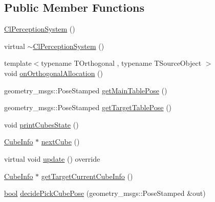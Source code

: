 \subsection*{Public Member Functions}
\begin{DoxyCompactItemize}
\item 
\hyperlink{classsm__moveit__screw__loop_1_1cl__perception__system_1_1ClPerceptionSystem_a5a52d556c4803761c7f33cd6f337861b}{Cl\+Perception\+System} ()
\item 
virtual \hyperlink{classsm__moveit__screw__loop_1_1cl__perception__system_1_1ClPerceptionSystem_a5f4c34645ff095773988180c861456d0}{$\sim$\+Cl\+Perception\+System} ()
\item 
{\footnotesize template$<$typename T\+Orthogonal , typename T\+Source\+Object $>$ }\\void \hyperlink{classsm__moveit__screw__loop_1_1cl__perception__system_1_1ClPerceptionSystem_aa8d51d8eb33bfb62e25e623bc7ee1ec0}{on\+Orthogonal\+Allocation} ()
\item 
geometry\+\_\+msgs\+::\+Pose\+Stamped \hyperlink{classsm__moveit__screw__loop_1_1cl__perception__system_1_1ClPerceptionSystem_a134e71d552de7d2a601927cdb2903d2b}{get\+Main\+Table\+Pose} ()
\item 
geometry\+\_\+msgs\+::\+Pose\+Stamped \hyperlink{classsm__moveit__screw__loop_1_1cl__perception__system_1_1ClPerceptionSystem_aaef94ec7b4e2e9249829d4b24ad2499e}{get\+Target\+Table\+Pose} ()
\item 
void \hyperlink{classsm__moveit__screw__loop_1_1cl__perception__system_1_1ClPerceptionSystem_ae6355186bed36a732791854be792e200}{print\+Cubes\+State} ()
\item 
\hyperlink{structsm__moveit__screw__loop_1_1cl__perception__system_1_1CubeInfo}{Cube\+Info} $\ast$ \hyperlink{classsm__moveit__screw__loop_1_1cl__perception__system_1_1ClPerceptionSystem_a9f58986a4ad466ba1e5b46e9d4d971ac}{next\+Cube} ()
\item 
virtual void \hyperlink{classsm__moveit__screw__loop_1_1cl__perception__system_1_1ClPerceptionSystem_a171e1bf0334b2eb957792ecb3ad11b7a}{update} () override
\item 
\hyperlink{structsm__moveit__screw__loop_1_1cl__perception__system_1_1CubeInfo}{Cube\+Info} $\ast$ \hyperlink{classsm__moveit__screw__loop_1_1cl__perception__system_1_1ClPerceptionSystem_ad9231b87b9592cc5c847ce1b92a75446}{get\+Target\+Current\+Cube\+Info} ()
\item 
\hyperlink{classbool}{bool} \hyperlink{classsm__moveit__screw__loop_1_1cl__perception__system_1_1ClPerceptionSystem_ad56389a13e7ce637a9095eff8837119f}{decide\+Pick\+Cube\+Pose} (geometry\+\_\+msgs\+::\+Pose\+Stamped \&out)

\end{DoxyCompactItemize}
